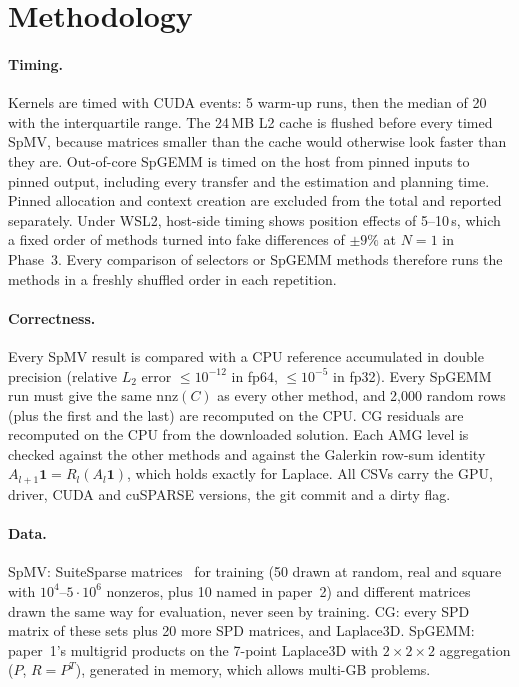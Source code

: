 \section{Methodology}\label{sec:method}

\paragraph{Timing.} Kernels are timed with CUDA events: 5 warm-up runs, then the median of 20 with the
interquartile range. The 24\,MB L2 cache is flushed before every timed SpMV, because matrices smaller than the cache
would otherwise look faster than they are. Out-of-core SpGEMM is timed on the host from pinned inputs to pinned output,
including every transfer and the estimation and planning time. Pinned allocation and context creation are excluded
from the total and reported separately. Under WSL2, host-side timing shows position effects of 5--10\,\textmu s, which
a fixed order of methods turned into fake differences of $\pm 9\%$ at $N=1$ in Phase~3. Every comparison of
selectors or SpGEMM methods therefore runs the methods in a freshly shuffled order in each repetition.

\paragraph{Correctness.} Every SpMV result is compared with a CPU reference accumulated in double precision
(relative $L_2$ error $\le 10^{-12}$ in fp64, $\le 10^{-5}$ in fp32). Every SpGEMM run must give the same
$\mathrm{nnz}(C)$ as every other method, and 2,000 random rows (plus the first and the last) are recomputed on the CPU.
CG residuals are recomputed on the CPU from the downloaded solution. Each AMG level is checked against the other
methods and against the Galerkin row-sum identity $A_{l+1}\mathbf 1 = R_l(A_l \mathbf 1)$, which holds exactly for
Laplace. All CSVs carry the GPU, driver, CUDA and cuSPARSE versions, the git commit and a dirty flag.

\paragraph{Data.} SpMV:  SuiteSparse matrices~\cite{davis2011suitesparse} for training (50 drawn at
random, real and square with $10^4$--$5\cdot10^6$ nonzeros, plus 10 named in paper~2) and 
different matrices drawn the same way for evaluation, never seen by training. CG: every SPD matrix of these sets plus
20 more SPD matrices, and Laplace3D. SpGEMM: paper~1's multigrid products on the 7-point Laplace3D with $2\times2\times2$
aggregation ($P$, $R=P^T$), generated in memory, which allows multi-GB problems.

